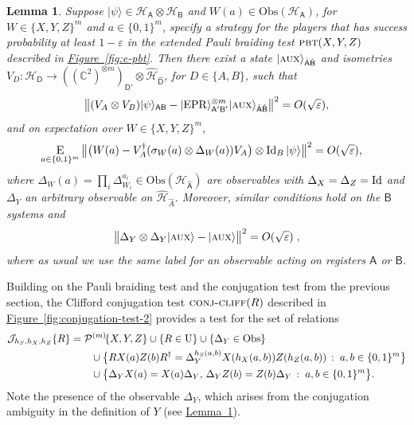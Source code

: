 \documentclass[11pt]{article}
\numberwithin{equation}{section}
\newtheorem{lemma}[theorem]{Lemma}
\theoremstyle{definition}
\theoremstyle{plain}
\newcommand{\C}{\mathbb C}
\newcommand{\expref}[2]{\hyperref[#2]{#1~\ref{#2}}}
\newcommand{\ket}[1]{|#1\rangle}
\newcommand{\Id}{\ensuremath{\mathop{\rm Id}\nolimits}}
\newcommand{\Es}[1]{\ensuremath{\mathop{\textsc{E}}}_{#1}} %
\newcommand{\setft}[1]{\mathrm{#1}}
\newcommand{\Obs}{\setft{Obs}}
\newcommand{\Unitary}{\setft{U}}
\newcommand{\reg}[1]{{\textsf{#1}}}
\newcommand{\mH}{\mathcal{H}}
\newcommand{\eps}{\varepsilon}
\newcommand{\EPR}{{\rm EPR}}
\newcommand{\pbt}{\textsc{pbt}}
\newcommand{\aux}{\textsc {aux}}
\newcommand{\conjc}{\textsc{conj-cliff}}
\newcommand{\conjr}{\mathcal{J}\!}
\newcommand{\paulin}{\mathcal{P}^{(m)}\!}
\begin{document}
\begin{lemma}\label{lem:xyz-rigid}
Suppose $\ket{\psi}\in\mH_\reg{A}\otimes \mH_\reg{B}$ and $W(a) \in \Obs(\mH_\reg{A})$, for $W\in \{X,Y,Z\}^m$ and $a\in\{0,1\}^m$, specify a strategy for the players that has success probability at least $1-\eps$ in the extended Pauli braiding test $\pbt(X,Y,Z)$ described in \expref{Figure}{fig:e-pbt}. 
Then there exist a state $\ket{\aux}_{\hat{\reg{A}}\hat{\reg{B}}}$  and  isometries $V_D:\mH_\reg{D} \to ((\C^2)^{\otimes m})_{\reg{D}'}  \otimes \hat{\mH}_{\hat{\reg{D}}}$, for $D\in\{A,B\}$, such that
$$\big\| (V_A \otimes V_B) \ket{\psi}_{\reg{AB}} - \ket{\EPR}_{\reg{A}'\reg{B}'}^{\otimes m} \ket{\aux}_{\hat{\reg{A}}\hat{\reg{B}}} \big\|^2 = O(\sqrt{\eps}),$$
and on expectation over $W\in \{X,Y,Z\}^m$,
\begin{align}\label{eq:test-sigmay}
 \Es{a\in\{0,1\}^m} \big\| \big(W(a) -V_A^\dagger (\sigma_W(a) \otimes \Delta_W(a)) V_A\big) \otimes \Id_B \ket{\psi} \big\|^2 &= O(\sqrt{\eps}),
\end{align}
where $\Delta_W(a) = \prod_i \Delta_{W_i}^{a_i} \in \Obs({\mH}_{\hat{\reg{A}}})$ are observables with $\Delta_{X}=\Delta_{Z}=\Id$ and $\Delta_{Y}$ an arbitrary observable on $\hat{\mH}_{\hat{A}}$. Moreover, similar conditions hold on the $\reg{B}$ systems and
	$$ \big\|\Delta_Y \otimes \Delta_Y \ket{\aux} - \ket{\aux} \big\|^2 = O(\sqrt{\eps})\;,$$
	where as usual we use the same label for an observable acting on registers $\reg{A}$ or $\reg{B}$. 
\end{lemma} 


Building on the Pauli braiding test and the conjugation test from the previous section, the Clifford conjugation test $\conjc(R)$ described in \expref{Figure}{fig:conjugation-test-2} 
 provides a test for the set of relations 
\begin{align}
\conjr_{h_S,h_X,h_Z}\{R\} &= \paulin\{X,Y,Z\}  \cup \{R\in \Unitary\} \cup \{\Delta_Y\in\Obs\}\notag\\
&\qquad \cup \big\{ R X(a)Z(b)R^\dagger = \Delta_Y^{h_S(a,b)}X(h_X(a,b))Z(h_Z(a,b))\,:\; a,b\in\{0,1\}^m\big\} \notag\\
&\qquad \cup \big\{ \Delta_Y X(a) = X(a)\Delta_Y,\,\Delta_Y Z(b)=Z(b)\Delta_Y\,:\; a,b\in\{0,1\}^m\big\}.\label{eq:def-hr}
\end{align}
Note the presence of the observable $\Delta_Y$, which arises from the conjugation ambiguity in the definition of $Y$ (see \expref{Lemma}{lem:xyz-rigid}). 
\end{document}
